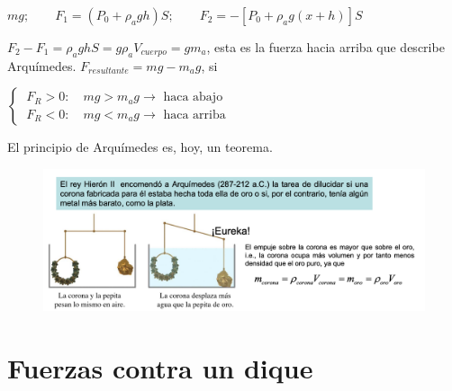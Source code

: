 $mg;\qquad F_1=(P_0+\rho_a g h)S; \qquad F_2=-[P_0+\rho_ag(x+h)]S$

$F_2-F_1=\rho_a g h S=g \rho_a V_{cuerpo}=g m_a$, esta es la fuerza hacia arriba que describe Arquímedes.
$F_{resultante}=mg-m_ag$, si 

$\begin{cases}\ F_R>0:\quad mg>m_ag \to \text{ haca abajo} \\ \ F_R<0:\quad mg<m_ag \to \text{ haca arriba} \end{cases}$


El principio de Arquímedes es, hoy, un teorema.


\begin{figure}[H]
	\centering
	\includegraphics[width=1\textwidth]{imagenes/imagenes07/T07IM12.png}
\end{figure}

\section{Fuerzas contra un dique}

